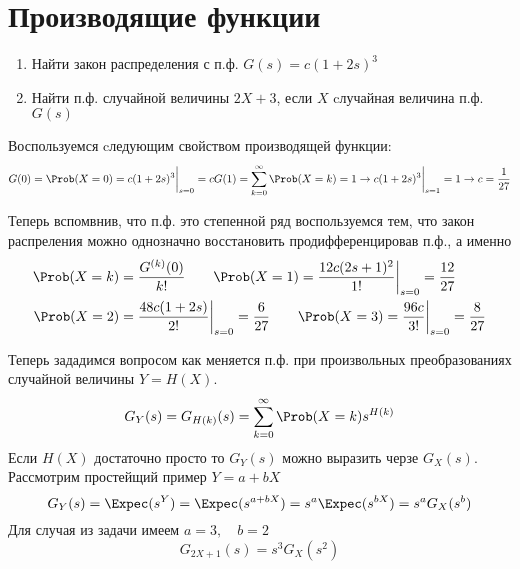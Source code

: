 
\section{Производящие функции}


\begin{prb}
	\hspace{1cm}
	\begin{enumerate}
		\item Найти закон распределения с п.ф. $G(s) = c (1 + 2s)^3$
		\item Найти п.ф. случайной величины $ 2X + 3 $, если $X$ cлучайная величина п.ф. $ G(s)$
	\end{enumerate}
	
\end{prb}
	
\begin{sol}
	Воспользуемся cледующим свойством производящей функции:
	\begin{equation}
		G(0) = \Prob(X=0)  =  c (1 + 2s)^3 \bigg|_{s=0} = c \\
		G(1) = \sum_{k=0}^{\infty} \Prob(X=k) = 1  \rightarrow c (1 + 2s)^3 \bigg|_{s=1}  = 1 \rightarrow c =  \frac{1}{27}
	\end{equation} 

	Теперь вспомвнив, что п.ф. это степенной ряд воспользуемся тем, что закон распреления можно однозначно восстановить продифференцировав п.ф., а именно 
	\begin{align*}
		\Prob(X=k) & = \frac{G^{(k)}(0)}{k!} \qquad  \Prob(X=1) = \frac{12c(2 s+1)^2}{1!} \bigg|_{s=0}  = \frac{12}{27} \\
		  \Prob(X=2) & = \frac{48 c (1 + 2 s)}{2!} \bigg|_{s=0} = \frac{6}{27} \qquad \Prob(X=3) = \frac{96c}{3!} \bigg|_{s=0} = \frac{8}{27} \\
	\end{align*}

	Теперь зададимся вопросом как меняется п.ф. при произвольных преобразованиях случайной величины $Y = H(X)$.
	\begin{equation}
		G_{Y}(s) = G_{H(k)}(s) = \sum_{k=0}^{\infty} \Prob(X=k) s^{H(k)}
	\end{equation}
	Если $H(X)$  достаточно просто то $G_{Y}(s)$ можно выразить черзе $G_{X}(s)$.
	Рассмотрим простейщий пример $Y = a + b X$
	\begin{equation}
		G_{Y}(s) = \Expec(s^Y) = \Expec(s^{a + b X}) = s^{a}\Expec(s^{b X}) = s^a G_{X}(s^b)
	\end{equation}
	Для случая из задачи имеем $a = 3, \quad b = 2$ 
	\begin{equation}
			G_{2X + 1}(s) = s^3 G_{X}(s^2)
	\end{equation}
	
\end{sol}	


